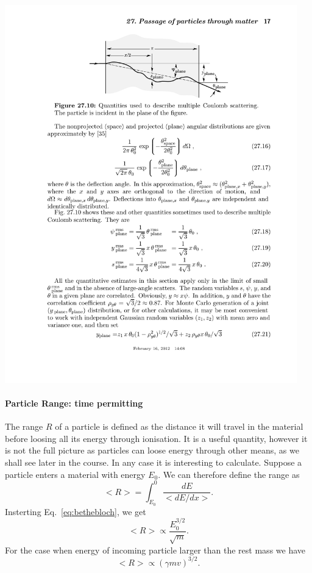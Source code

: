 \begin{center}
\includegraphics[width=0.95\textwidth]{fig/strongforce/matterinteractions/scattering_angle.pdf}
\end{center}


\paragraph{Particle Range: time permitting}
The range $R$ of a particle is defined as the distance it will travel
in the material before loosing all its energy through ionisation. It is a useful
quantity, however it is not the full picture as particles can loose energy through
other means, as we shall see later in the course.
In any case it is interesting to calculate. 
Suppose a particle enters a material with energy $E_0$. We can therefore define the range as
\[
<R>=\int_{E_0}^{0}\frac{dE}{<dE/dx>}.
\]
Insterting Eq.~\ref{eq:bethebloch}, we get 
\begin{equation}
<R>\propto \frac{E_{0}^{3/2}}{\sqrt{m}}.
\end{equation}
For the case when energy of incoming particle larger than the rest mass we have
\[
<R>\propto (\gamma m v)^{3/2}.
\]

